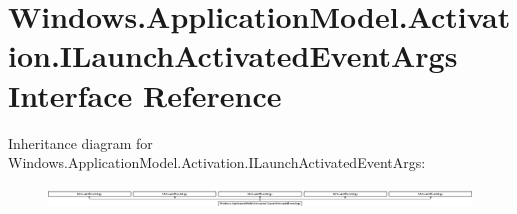 \hypertarget{interface_windows_1_1_application_model_1_1_activation_1_1_i_launch_activated_event_args}{}\section{Windows.\+Application\+Model.\+Activation.\+I\+Launch\+Activated\+Event\+Args Interface Reference}
\label{interface_windows_1_1_application_model_1_1_activation_1_1_i_launch_activated_event_args}
Inheritance diagram for Windows.\+Application\+Model.\+Activation.\+I\+Launch\+Activated\+Event\+Args\+:\begin{figure}[H]
\begin{center}
\leavevmode
\includegraphics[height=0.569975cm]{interface_windows_1_1_application_model_1_1_activation_1_1_i_launch_activated_event_args}
\end{center}
\end{figure}
